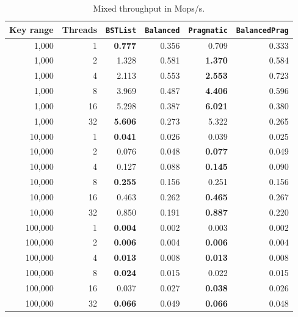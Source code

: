 \documentclass[a4paper,11pt]{article}
\newcommand{\code}[1]{\texttt{#1}}
\begin{document}
\begin{table}[H]
\centering
\caption{Mixed throughput in Mops/s.}
\label{tab:mixed-throughput}
\scriptsize
\setlength{\tabcolsep}{4pt}
\begin{tabular}{r r r r r r}
\toprule
Key range & Threads & \code{BSTList} & \code{Balanced} & \code{Pragmatic} & \code{BalancedPrag} \\
\midrule
1,000 & 1  & \textbf{0.777} & 0.356 & 0.709 & 0.333 \\
1,000 & 2  & 1.328 & 0.581 & \textbf{1.370} & 0.584 \\
1,000 & 4  & 2.113 & 0.553 & \textbf{2.553} & 0.723 \\
1,000 & 8  & 3.969 & 0.487 & \textbf{4.406} & 0.596 \\
1,000 & 16 & 5.298 & 0.387 & \textbf{6.021} & 0.380 \\
1,000 & 32 & \textbf{5.606} & 0.273 & 5.322 & 0.265 \\
\midrule
10,000 & 1  & \textbf{0.041} & 0.026 & 0.039 & 0.025 \\
10,000 & 2  & 0.076 & 0.048 & \textbf{0.077} & 0.049 \\
10,000 & 4  & 0.127 & 0.088 & \textbf{0.145} & 0.090 \\
10,000 & 8  & \textbf{0.255} & 0.156 & 0.251 & 0.156 \\
10,000 & 16 & 0.463 & 0.262 & \textbf{0.465} & 0.267 \\
10,000 & 32 & 0.850 & 0.191 & \textbf{0.887} & 0.220 \\
\midrule
100,000 & 1  & \textbf{0.004} & 0.002 & 0.003 & 0.002 \\
100,000 & 2  & \textbf{0.006} & 0.004 & \textbf{0.006} & 0.004 \\
100,000 & 4  & \textbf{0.013} & 0.008 & \textbf{0.013} & 0.008 \\
100,000 & 8  & \textbf{0.024} & 0.015 & 0.022 & 0.015 \\
100,000 & 16 & 0.037 & 0.027 & \textbf{0.038} & 0.026 \\
100,000 & 32 & \textbf{0.066} & 0.049 & \textbf{0.066} & 0.048 \\
\bottomrule
\end{tabular}
\end{table}
\end{document}
